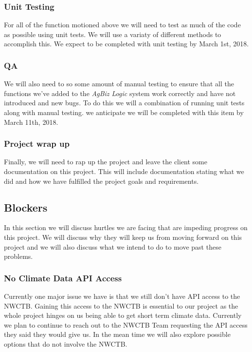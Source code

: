 \documentclass[onecolumn, draftclsnofoot,10pt, compsoc]{article}
\begin{document}
	    \subsubsection{Unit Testing}
	        For all of the function motioned above we will need to test as much of the code as possible using unit tests. We will use a variaty of different methods to accomplish this. We expect to be completed with unit testing by March 1st, 2018.\\
	    
	    \subsubsection{QA}
	        We will also need to so some amount of manual testing to ensure that all the functions we've added to the \textit{AgBiz Logic} system work correctly and have not introduced and new bugs. To do this we will a combination of running unit tests along with manual testing. we anticipate we will be completed with this item by March 11th, 2018.\\
	    
	    \subsubsection{Project wrap up}
	        Finally, we will need to rap up the project and leave the client some documentation on this project. This will include documentation stating what we did and how we have fulfilled the project goals and requirements.\\
	
	\subsection{Blockers}
	    In this section we will discuss hurtles we are facing that are impeding progress on this project. We will discuss why they will keep us from moving forward on this project and we will also discuss what we intend to do to move past these problems.\\
	    
	    \subsubsection{No Climate Data API Access}
	        Currently one major issue we have is that we still don't have API access to the NWCTB. Gaining this access to the NWCTB is essential to our project as the whole project hinges on us being able to get short term climate data. Currently we plan to continue to reach out to the NWCTB Team requesting the API access they said they would give us. In the mean time we will also explore possible options that do not involve the NWCTB.\\
	       
\end{document}
